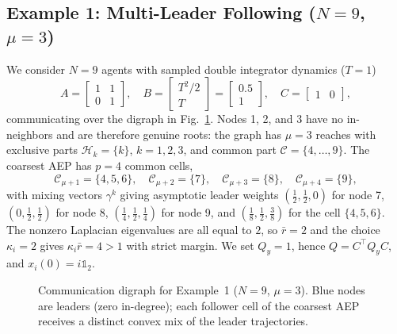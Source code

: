\documentclass[12pt]{elsarticle}
\theoremstyle{remark}
\newcommand{\ones}{\mathbb{1}}
\begin{document}
\subsection{Example 1: Multi-Leader Following ($N = 9$, $\mu = 3$)}
\label{subsec:sim1}
We consider $N = 9$ agents with sampled double integrator dynamics ($T = 1$)
\begin{equation}
A = \begin{bmatrix} 1 & 1 \\ 0 & 1 \end{bmatrix}, \quad
B = \begin{bmatrix} T^2/2 \\ T \end{bmatrix} = \begin{bmatrix} 0.5 \\ 1 \end{bmatrix}, \quad
C = \begin{bmatrix} 1 & 0 \end{bmatrix},
\label{eq:AB_ex1}
\end{equation}
communicating over the digraph in Fig.~\ref{fig:graph9}. Nodes 1, 2, and 3 have no in-neighbors and are therefore genuine roots: the graph has $\mu = 3$ reaches with exclusive parts $\mathcal{H}_k = \{k\}$, $k = 1,2,3$, and common part $\mathcal{C} = \{4,\ldots,9\}$. The coarsest AEP has $p = 4$ common cells,
\begin{equation*}
\mathcal{C}_{\mu+1} = \{4,5,6\}, \quad \mathcal{C}_{\mu+2} = \{7\}, \quad \mathcal{C}_{\mu+3} = \{8\}, \quad \mathcal{C}_{\mu+4} = \{9\},
\end{equation*}
with mixing vectors $\gamma^{k}$ giving asymptotic leader weights $(\tfrac12,\tfrac12,0)$ for node 7, $(0,\tfrac12,\tfrac12)$ for node 8, $(\tfrac14,\tfrac12,\tfrac14)$ for node 9, and $(\tfrac18,\tfrac12,\tfrac38)$ for the cell $\{4,5,6\}$. The nonzero Laplacian eigenvalues are all equal to $2$, so $\bar{r} = 2$ and the choice $\kappa_i = 2$ gives $\kappa_i\bar{r} = 4 > 1$ with strict margin. We set $Q_y = 1$, hence $Q = C^\top Q_y C$, and $x_i(0) = i\ones_2$.
\begin{figure}[!htbp]
\centering
{}
\caption{Communication digraph for Example~1 ($N=9$, $\mu=3$). Blue nodes are leaders (zero in-degree); each follower cell of the coarsest AEP receives a distinct convex mix of the leader trajectories.}
\label{fig:graph9}
\end{figure}
\end{document}
